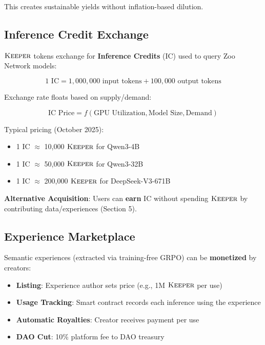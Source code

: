 This creates sustainable yields without inflation-based dilution.

\subsection{Inference Credit Exchange}

$\textsc{Keeper}$ tokens exchange for \textbf{Inference Credits} (IC) used to query Zoo Network models:

\begin{equation}
1 \text{ IC} = 1,000,000 \text{ input tokens} + 100,000 \text{ output tokens}
\end{equation}

Exchange rate floats based on supply/demand:

\begin{equation}
\text{IC Price} = f(\text{GPU Utilization}, \text{Model Size}, \text{Demand})
\end{equation}

Typical pricing (October 2025):
\begin{itemize}
\item 1 IC $\approx$ 10,000 $\textsc{Keeper}$ for Qwen3-4B
\item 1 IC $\approx$ 50,000 $\textsc{Keeper}$ for Qwen3-32B
\item 1 IC $\approx$ 200,000 $\textsc{Keeper}$ for DeepSeek-V3-671B
\end{itemize}

\textbf{Alternative Acquisition}: Users can \textbf{earn} IC without spending $\textsc{Keeper}$ by contributing data/experiences (Section 5).

\subsection{Experience Marketplace}

Semantic experiences (extracted via training-free GRPO) can be \textbf{monetized} by creators:

\begin{itemize}
\item \textbf{Listing}: Experience author sets price (e.g., 1M $\textsc{Keeper}$ per use)
\item \textbf{Usage Tracking}: Smart contract records each inference using the experience
\item \textbf{Automatic Royalties}: Creator receives payment per use
\item \textbf{DAO Cut}: 10\% platform fee to DAO treasury
\end{itemize}

